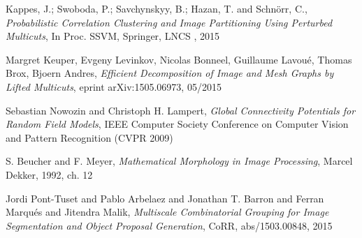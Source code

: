 \documentclass{beamer}
\begin{document}
\begin{thebibliography}{9}
 	Kappes, J.; Swoboda, P.; Savchynskyy, B.; Hazan, T. and Schnörr, C., 
 	\emph{Probabilistic Correlation Clustering and Image Partitioning Using Perturbed Multicuts}, 
 	 In Proc. SSVM, Springer, LNCS , 2015
 	 
 	Margret Keuper, Evgeny Levinkov, Nicolas Bonneel, Guillaume Lavoué, Thomas Brox, Bjoern Andres, 
 	\emph{Efficient Decomposition of Image and Mesh Graphs by Lifted Multicuts}, 
 	eprint arXiv:1505.06973, 05/2015
 	

	Sebastian Nowozin and Christoph H. Lampert, 
	\emph{Global Connectivity Potentials for Random Field Models}, 
	IEEE Computer Society Conference on Computer Vision and Pattern Recognition (CVPR 2009)

 	S. Beucher and F. Meyer,
 	\emph{Mathematical  Morphology  in  Image  Processing}, 
 	Marcel Dekker, 1992, ch. 12

 	Jordi Pont{-}Tuset and Pablo Arbelaez and Jonathan T. Barron and Ferran Marqu{\'{e}}s and Jitendra Malik, 
 	\emph{Multiscale Combinatorial Grouping for Image Segmentation and Object Proposal Generation}, 
 	CoRR, abs/1503.00848, 2015

\end{thebibliography}
	
	
	
	


	



	
\end{document}
